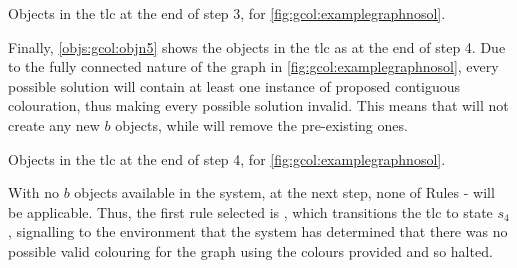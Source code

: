 \begin{cpobjectsfloat}
\begin{cpobjects}

    
    
    
        \cpobjectsline{\vdots}
        
    
    
\end{cpobjects}
\caption{\label{objs:gcol:objn4}Objects in the \gls{tlc} at the end of step 3, for \cref{fig:gcol:examplegraphnosol}.}
\end{cpobjectsfloat}

Finally, \cref{objs:gcol:objn5} shows the objects in the \gls{tlc} as at the end of step 4.  Due to the fully connected nature of the graph in \cref{fig:gcol:examplegraphnosol}, every possible solution will contain at least one instance of proposed contiguous colouration, thus making every possible solution invalid.  This means that  will not create any new \(b\) objects, while  will remove the pre-existing ones.

\begin{cpobjectsfloat}
\begin{cpobjects}

    
\end{cpobjects}
\caption{\label{objs:gcol:objn5}Objects in the \gls{tlc} at the end of step 4, for \cref{fig:gcol:examplegraphnosol}.}
\end{cpobjectsfloat}

With no \(b\) objects available in the system, at the next step, none of Rules - will be applicable.  Thus, the first rule selected is , which transitions the \gls{tlc} to state \(s_4\), signalling to the environment that the system has determined that there was no possible valid colouring for the graph using the colours provided and so halted.